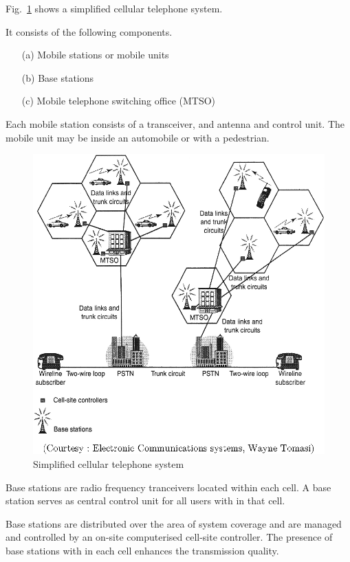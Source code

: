 Fig.~\ref{fig10.4} shows a simplified cellular telephone system.

It consists of the following components.
\begin{itemize}
\item[(a)] Mobile stations or mobile units

\item[(b)] Base stations

\item[(c)] Mobile telephone switching office (MTSO)
\end{itemize}

Each mobile station consists of a transceiver, and antenna and control unit. The mobile unit may be inside an automobile or with a pedestrian.
\begin{figure}[H]
\centering
\includegraphics[scale=.92]{chap10/fig10.4.eps}
\caption{Simplified cellular telephone system}\label{fig10.4}
\end{figure}

Base stations are radio frequency tranceivers located within each cell. A base station serves as central control unit for all users with in that cell.

Base stations are distributed over the area of system coverage and are managed and controlled by an on-site computerised cell-site controller. The presence of base stations with in each cell enhances the transmission quality.

